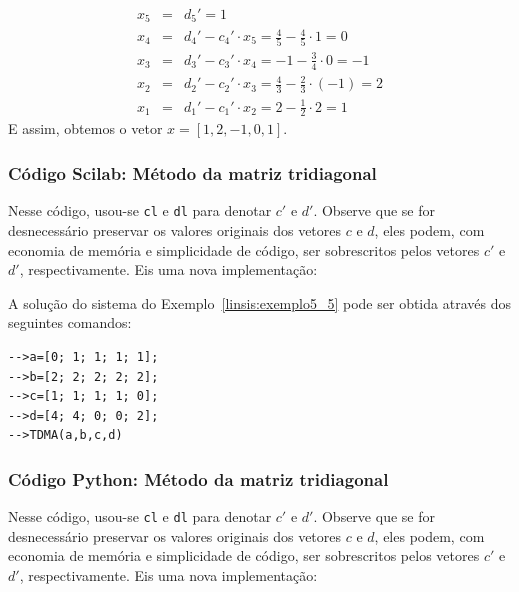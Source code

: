 \begin{ex}
\begin{eqnarray*}
 x_5&=&d_5'=1\\
 x_4&=&d_4'-c_4'\cdot x_5=\frac{4}{5}-\frac{4}{5}\cdot 1 = 0\\
 x_3&=&d_3'-c_3'\cdot x_4=-1-\frac{3}{4}\cdot 0 = -1\\
 x_2&=&d_2'-c_2'\cdot x_3=\frac{4}{3}-\frac{2}{3}\cdot (-1) = 2\\
 x_1&=&d_1'-c_1'\cdot x_2=2-\frac{1}{2}\cdot 2 = 1
 \end{eqnarray*}
E assim, obtemos o vetor $x=[1, 2, -1, 0, 1]$.
\end{ex}


\ifisscilab
\subsubsection{Código Scilab: Método da matriz tridiagonal}



Nesse código, usou-se \verb+cl+ e \verb+dl+ para denotar $c'$ e $d'$. Observe que se for desnecessário preservar os valores originais dos vetores $c$ e $d$, eles podem, com economia de memória e simplicidade de código, ser sobrescritos pelos vetores $c'$ e $d'$, respectivamente. Eis uma nova implementação:



A solução do sistema do Exemplo~\ref{linsis:exemplo5_5} pode ser obtida através dos seguintes comandos:
\begin{verbatim}
-->a=[0; 1; 1; 1; 1];
-->b=[2; 2; 2; 2; 2];
-->c=[1; 1; 1; 1; 0];
-->d=[4; 4; 0; 0; 2];
-->TDMA(a,b,c,d)
\end{verbatim}

\fi


\ifispython
\subsubsection{Código Python: Método da matriz tridiagonal}



Nesse código, usou-se \verb+cl+ e \verb+dl+ para denotar $c'$ e $d'$. Observe que se for desnecessário preservar os valores originais dos vetores $c$ e $d$, eles podem, com economia de memória e simplicidade de código, ser sobrescritos pelos vetores $c'$ e $d'$, respectivamente. Eis uma nova implementação:

